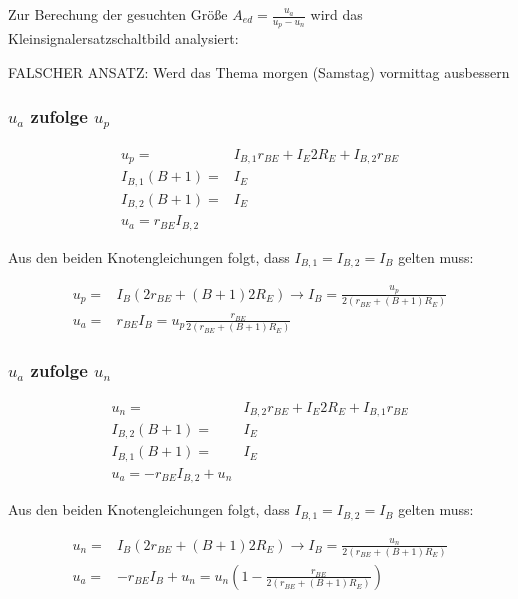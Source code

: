 Zur Berechung der gesuchten Größe $A_{ed} = \frac{u_a}{u_p - u_n}$ wird das Kleinsignalersatzschaltbild analysiert:

FALSCHER ANSATZ: Werd das Thema morgen (Samstag) vormittag ausbessern

\subsubsection{$u_a$ zufolge $u_p$}

\begin{align}
    u_p =& I_{B,1} r_{BE} + I_E 2 R_E + I_{B,2} r_{BE} \\
    I_{B,1} (B+1) =& I_E \\
    I_{B,2} (B+1) =& I_E \\
    u_a = r_{BE} I_{B,2}
\end{align}

Aus den beiden Knotengleichungen folgt, dass $I_{B,1} = I_{B,2} = I_B$ gelten muss:

\begin{align}
    u_p =& I_{B} \left( 2 r_{BE} + (B+1) 2 R_E \right) \rightarrow I_B = \frac{u_p}{2 \left( r_{BE} + (B+1) R_E \right)}\\
    u_a =& r_{BE} I_{B} = u_p \frac{r_{BE}}{2 \left( r_{BE} + (B+1) R_E \right)}
\end{align}

\subsubsection{$u_a$ zufolge $u_n$}

\begin{align}
    u_n =& I_{B,2} r_{BE} + I_E 2 R_E + I_{B,1} r_{BE} \\
    I_{B,2} (B+1) =& I_E \\
    I_{B,1} (B+1) =& I_E \\
    u_a = - r_{BE} I_{B,2} + u_n
\end{align}

Aus den beiden Knotengleichungen folgt, dass $I_{B,1} = I_{B,2} = I_B$ gelten muss:

\begin{align}
    u_n =& I_{B} \left( 2 r_{BE} + (B+1) 2 R_E \right) \rightarrow I_B = \frac{u_n}{2 \left( r_{BE} + (B+1) R_E \right)}\\
    u_a =& - r_{BE} I_{B} + u_n = u_n \left( 1 - \frac{r_{BE}}{2 \left( r_{BE} + (B+1) R_E \right)} \right)
\end{align}

